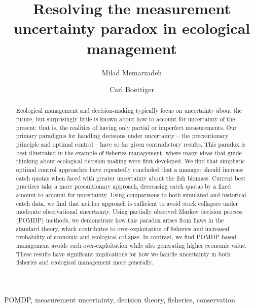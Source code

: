 \documentclass[3p]{elsarticle} %
\begin{document}
\begin{frontmatter}

  \title{Resolving the measurement uncertainty paradox in ecological management}
    \author[a]{Milad Memarzadeh}
  
  
    \author[a, 1]{Carl Boettiger}
  
  
      \address[a]{Dept of Environmental Science, Policy, and Management, University of
California Berkeley, Berkeley CA 94720-3114, USA}
  
  \begin{abstract}
  Ecological management and decision-making typically focus on uncertainty
  about the future, but surprisingly little is known about how to account
  for uncertainty of the present: that is, the realities of having only
  partial or imperfect measurements. Our primary paradigms for handling
  decisions under uncertainty -- the precautionary principle and optimal
  control -- have so far given contradictory results. This paradox is best
  illustrated in the example of fisheries management, where many ideas
  that guide thinking about ecological decision making were first
  developed. We find that simplistic optimal control approaches have
  repeatedly concluded that a manager should increase catch quotas when
  faced with greater uncertainty about the fish biomass. Current best
  practices take a more precautionary approach, decreasing catch quotas by
  a fixed amount to account for uncertainty. Using comparisons to both
  simulated and historical catch data, we find that neither approach is
  sufficient to avoid stock collapses under moderate observational
  uncertainty. Using partially observed Markov decision process (POMDP)
  methods, we demonstrate how this paradox arises from flaws in the
  standard theory, which contributes to over-exploitation of fisheries and
  increased probability of economic and ecological collapse. In contrast,
  we find POMDP-based management avoids such over-exploitation while also
  generating higher economic value. These results have significant
  implications for how we handle uncertainty in both fisheries and
  ecological management more generally.
  \end{abstract}
   \begin{keyword} POMDP, measurement uncertainty, decision theory, fisheries, conservation\end{keyword}
 \end{frontmatter}
\end{document}
